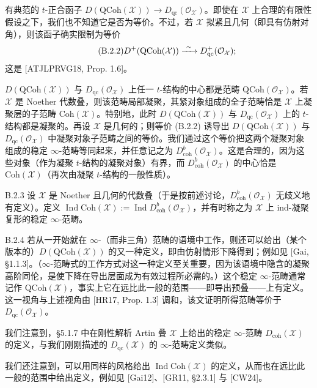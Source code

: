有典范的 $t$-正合函子 $D(\mathrm{QCoh}(\mathcal X))\to D_{\mathrm{qc}}(\mathcal O_{\mathcal X})$。即使在 $\mathcal X$ 上合理的有限性假设之下，我们也不知道它是否为等价。不过，若 $\mathcal X$ 拟紧且几何（即具有仿射对角），则该函子确实限制为等价
\begin{equation}\tag{B.2.2}\label{eq:a4-18-10}
D^+(\mathrm{QCoh}(\mathcal X))\xrightarrow{\ \sim\ } D^+_{\mathrm{qc}}(\mathcal O_{\mathcal X});
\end{equation}
这是 [ATJLPRVG18, Prop. 1.6]。

$D(\mathrm{QCoh}(\mathcal X))$ 与 $D_{\mathrm{qc}}(\mathcal O_{\mathcal X})$ 上任一 $t$-结构的中心都是范畴 $\mathrm{QCoh}(\mathcal O_{\mathcal X})$。若 $\mathcal X$ 是 Noether 代数叠，则该范畴局部凝聚，其紧对象组成的全子范畴恰是 $\mathcal X$ 上凝聚层的子范畴 $\mathrm{Coh}(\mathcal X)$。特别地，此时 $D(\mathrm{QCoh}(\mathcal X))$ 与 $D_{\mathrm{qc}}(\mathcal O_{\mathcal X})$ 上的 $t$-结构都是凝聚的。再设 $\mathcal X$ 是几何的；则等价 (B.2.2) 诱导出 $D(\mathrm{QCoh}(\mathcal X))$ 与 $D_{\mathrm{qc}}(\mathcal O_{\mathcal X})$ 中凝聚对象子范畴之间的等价。我们通过这个等价把这两个凝聚对象组成的稳定 $\infty$-范畴等同起来，并任意记之为 $D^b_{\mathrm{coh}}(\mathcal O_{\mathcal X})$。这是合理的，因为这些对象（作为凝聚 $t$-结构的凝聚对象）有界，而 $D^b_{\mathrm{coh}}(\mathcal O_{\mathcal X})$ 的中心恰是 $\mathrm{Coh}(\mathcal X)$（再次由凝聚 $t$-结构的一般性质）。

\begin{defn}{B.2.3}\label{thm:a4-18-22}
设 $\mathcal X$ 是 Noether 且几何的代数叠（于是按前述讨论，$D^b_{\mathrm{coh}}(\mathcal O_{\mathcal X})$ 无歧义地有定义）。定义 $\operatorname{Ind}\mathrm{Coh}(\mathcal X):=\operatorname{Ind}D^b_{\mathrm{coh}}(\mathcal O_{\mathcal X})$，并有时称之为 $\mathcal X$ 上 ind-凝聚复形的稳定 $\infty$-范畴。
\end{defn}

\begin{rem}{B.2.4}\label{thm:a4-18-23}
若从一开始就在 $\infty$-（而非三角）范畴的语境中工作，则还可以给出（某个版本的）$D(\mathrm{QCoh}(\mathcal X))$ 的又一种定义，即由仿射情形下降得到；例如见 [Gai, §1.1.3]。（$\infty$-范畴式的工作方式对这一种定义至关重要，因为该语境中隐含的凝聚高阶同伦，是使下降在导出层面成为有效过程所必需的。）这个稳定 $\infty$-范畴通常记作 $\mathrm{QCoh}(\mathcal X)$，事实上它在远比此一般的范围——即导出预叠——上有定义。这一视角与上述视角由 [HR17, Prop. 1.3] 调和，该文证明所得范畴等价于 $D_{\mathrm{qc}}(\mathcal O_{\mathcal X})$。

我们注意到，§5.1.7 中在刚性解析 Artin 叠 $\mathcal X$ 上给出的稳定 $\infty$-范畴 $D_{\mathrm{coh}}(\mathcal X)$ 的定义，与我们刚刚描述的 $D_{\mathrm{qc}}(\mathcal X)$ 的 $\infty$-范畴定义类似。

我们还注意到，可以用同样的风格给出 $\operatorname{Ind}\mathrm{Coh}(\mathcal X)$ 的定义，从而也在远比此一般的范围中给出定义，例如见 [Gai12]、[GR11, §2.3.1] 与 [CW24]。
\end{rem}

